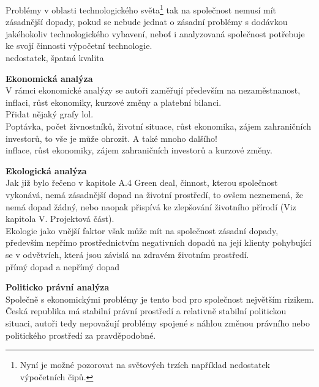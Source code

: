 Problémy v oblasti technologického světa\footnote{Nyní je možné pozorovat na světových trzích například nedostatek výpočetních čipů.} tak na společnost nemusí mít zásadnější dopady, pokud se nebude jednat o zásadní problémy s dodávkou jakéhokoliv technologického vybavení, neboť i analyzovaná společnost potřebuje ke svojí činnosti výpočetní technologie.\\

nedostatek, špatná kvalita

\newpage

\noindent\textbf{Ekonomická analýza}\\

V rámci ekonomické analýzy se autoři zaměřují především na nezaměstnanost, inflaci, růst ekonomiky, kurzové změny a platební bilanci.\\

Přidat nějaký grafy lol.\\

Poptávka, počet živnostníků, životní situace, růst ekonomika, zájem zahraničních investorů, to vše je může ohrozit. A také mnoho dalšího!\\

inflace, růst ekonomiky, zájem zahraničních investorů a kurzové změny.

\noindent\textbf{Ekologická analýza}\\

Jak již bylo řečeno v kapitole A.4 Green deal, činnost, kterou společnost vykonává, nemá zásadnější dopad na životní prostředí, to ovšem neznemená, že nemá dopad žádný, nebo naopak přispívá ke zlepšování životního přírodí (Viz kapitola V. Projektová část).\\

Ekologie jako vnější faktor však může mít na společnost zásadní dopady, především nepřímo prostřednictvím negativních dopadů na její klienty pohybující se v odvětvích, která jsou závislá na zdravém životním prostředí.\\

přímý dopad a nepřímý dopad

\noindent\textbf{Politicko právní analýza}\\

Společně s ekonomickými problémy je tento bod pro společnost největším rizikem. Česká republika má stabilní právní prostředí a relativně stabilní politickou situaci, autoři tedy nepovažují problémy spojené s náhlou změnou právního nebo politického prostředí za pravděpodobné.\\

